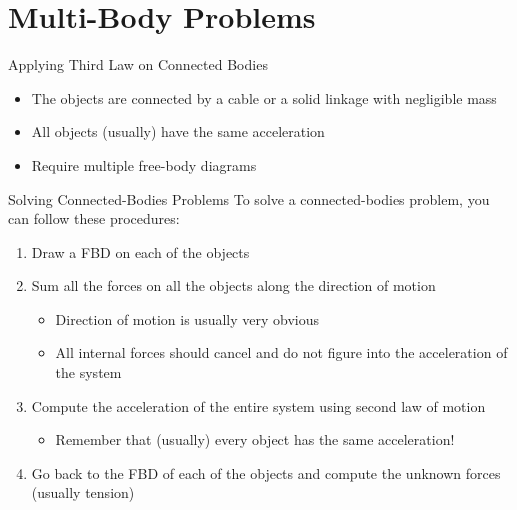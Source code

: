\documentclass[12pt,compress,aspectratio=169]{beamer}
\begin{document}
\section{Multi-Body Problems}

\begin{frame}{Applying Third Law on Connected Bodies}
  \begin{center}
  \end{center}
  \begin{itemize}
  \item The objects are connected by a cable or a solid linkage with negligible
    mass
  \item All objects (usually) have the same acceleration
  \item Require multiple free-body diagrams
  \end{itemize}
\end{frame}



\begin{frame}{Solving Connected-Bodies Problems}
  To solve a connected-bodies problem, you can follow these procedures:
  \begin{enumerate}
  \item Draw a FBD on each of the objects
  \item Sum all the forces on all the objects along the direction of motion
    \begin{itemize}
    \item Direction of motion is usually very obvious
    \item All internal forces should cancel and do not figure into the
      acceleration of the system
    \end{itemize}
  \item Compute the acceleration of the entire system using second law of motion
    \begin{itemize}
    \item Remember that (usually) every object has the same acceleration!
    \end{itemize}
  \item Go back to the FBD of each of the objects and compute the unknown
    forces (usually tension)
  \end{enumerate}
\end{frame}
\end{document}
